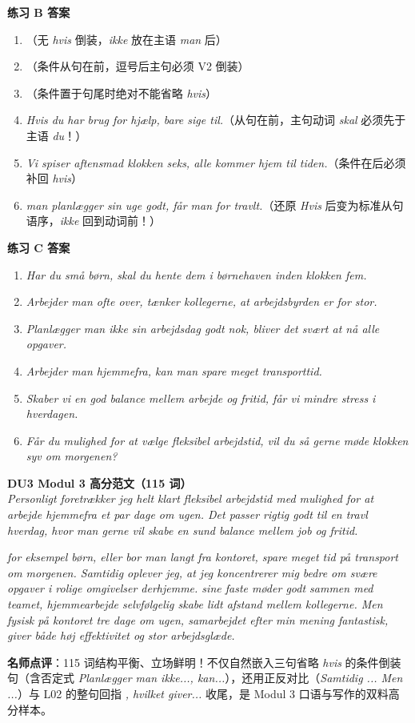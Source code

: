 \begin{answerbox}
\textbf{练习 B 答案}
\begin{enumerate}
  \item {}（无 \textit{hvis} 倒装，\textit{ikke} 放在主语 \textit{man} 后）
  \item {}（条件从句在前，逗号后主句必须 V2 倒装）
  \item {}（条件置于句尾时绝对不能省略 \textit{hvis}）
  \item \textit{Hvis du har brug for hjælp,  bare sige til.}（从句在前，主句动词 \textit{skal} 必须先于主语 \textit{du}！）
  \item \textit{Vi spiser aftensmad klokken seks,  alle kommer hjem til tiden.}（条件在后必须补回 \textit{hvis}）
  \item \textit{ man  planlægger sin uge godt, får man for travlt.}（还原 \textit{Hvis} 后变为标准从句语序，\textit{ikke} 回到动词前！）
\end{enumerate}

\textbf{练习 C 答案}
\begin{enumerate}
  \item \textit{Har du små børn, skal du hente dem i børnehaven inden klokken fem.}
  \item \textit{Arbejder man ofte over, tænker kollegerne, at arbejdsbyrden er for stor.}
  \item \textit{Planlægger man ikke sin arbejdsdag godt nok, bliver det svært at nå alle opgaver.}
  \item \textit{Arbejder man hjemmefra, kan man spare meget transporttid.}
  \item \textit{Skaber vi en god balance mellem arbejde og fritid, får vi mindre stress i hverdagen.}
  \item \textit{Får du mulighed for at vælge fleksibel arbejdstid, vil du så gerne møde klokken syv om morgenen?}
\end{enumerate}

\textbf{DU3 Modul 3 高分范文（115 词）}\\
\textit{Personligt foretrækker jeg helt klart fleksibel arbejdstid med mulighed for at arbejde hjemmefra et par dage om ugen. Det passer rigtig godt til en travl hverdag, hvor man gerne vil skabe en sund balance mellem job og fritid.}

\textit{ for eksempel børn, eller bor man langt fra kontoret,  spare meget tid på transport om morgenen. Samtidig oplever jeg, at jeg koncentrerer mig bedre om svære opgaver i rolige omgivelser derhjemme.   sine faste møder godt sammen med teamet,  hjemmearbejde selvfølgelig skabe lidt afstand mellem kollegerne. Men  fysisk på kontoret tre dage om ugen,  samarbejdet efter min mening fantastisk,  giver både høj effektivitet og stor arbejdsglæde.}

\small\textbf{名师点评}：115 词结构平衡、立场鲜明！不仅自然嵌入三句省略 \textit{hvis} 的条件倒装句（含否定式 \textit{Planlægger man ikke..., kan...}），还用正反对比（\textit{Samtidig ... Men ...}）与 L02 的整句回指 \textit{, hvilket giver...} 收尾，是 Modul 3 口语与写作的双料高分样本。
\end{answerbox}
